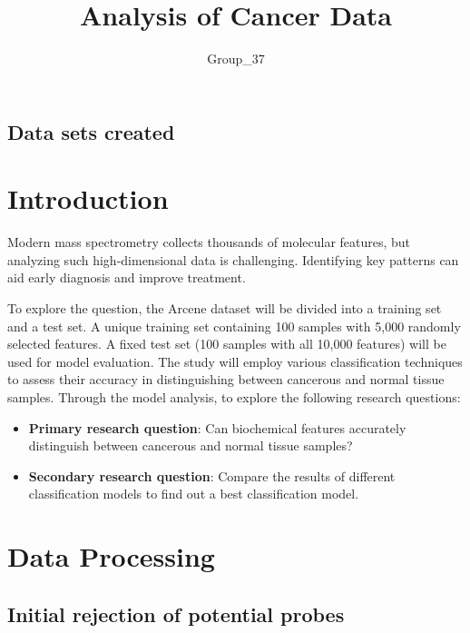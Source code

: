 \documentclass[
  12pt,
  letterpaper,
  DIV=11,
  numbers=noendperiod]{scrartcl}
\title{Analysis of Cancer Data}
\author{Group\_37}
\date{}
\begin{document}
\maketitle


\subsection{Data sets created}\label{data-sets-created}

\section{Introduction}\label{introduction}

Modern mass spectrometry collects thousands of molecular features, but
analyzing such high-dimensional data is challenging. Identifying key
patterns can aid early diagnosis and improve treatment.

To explore the question, the Arcene dataset will be divided into a
training set and a test set. A unique training set containing 100
samples with 5,000 randomly selected features. A fixed test set (100
samples with all 10,000 features) will be used for model evaluation. The
study will employ various classification techniques to assess their
accuracy in distinguishing between cancerous and normal tissue samples.
Through the model analysis, to explore the following research questions:

\begin{itemize}
\item
  \textbf{Primary research question}: Can biochemical features
  accurately distinguish between cancerous and normal tissue samples?
\item
  \textbf{Secondary research question}: Compare the results of different
  classification models to find out a best classification model.
\end{itemize}

\section{Data Processing}\label{data-processing}

\subsection{Initial rejection of potential
probes}\label{initial-rejection-of-potential-probes}
\end{document}
